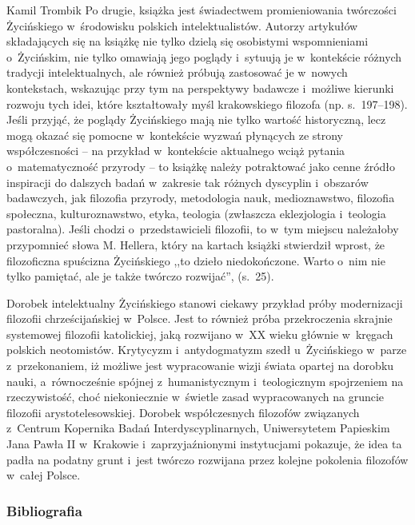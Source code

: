 \begin{recplenv}{Kamil Trombik}
Po drugie, książka jest świadectwem promieniowania twórczości Życińskiego w~środowisku polskich intelektualistów. Autorzy artykułów składających się na książkę nie tylko dzielą się osobistymi wspomnieniami o~Życińskim, nie tylko omawiają jego poglądy i~sytuują je w~kontekście różnych tradycji intelektualnych, ale również próbują zastosować je w~nowych kontekstach, wskazując przy tym na perspektywy badawcze i~możliwe kierunki rozwoju tych idei, które kształtowały myśl krakowskiego filozofa (np. s.~197–198). Jeśli przyjąć, że poglądy Życińskiego mają nie tylko wartość historyczną, lecz mogą okazać się pomocne w~kontekście wyzwań płynących ze strony współczesności -- na przykład w~kontekście aktualnego wciąż pytania o~matematyczność przyrody -- to książkę należy potraktować jako cenne źródło inspiracji do dalszych badań w~zakresie tak różnych dyscyplin i~obszarów badawczych, jak filozofia przyrody, metodologia nauk, medioznawstwo, filozofia społeczna, kulturoznawstwo, etyka, teologia (zwłaszcza eklezjologia i~teologia pastoralna). Jeśli chodzi o~przedstawicieli filozofii, to w~tym miejscu należałoby przypomnieć słowa M. Hellera, który na kartach książki stwierdził wprost, że filozoficzna spuścizna Życińskiego ,,to dzieło niedokończone. Warto o~nim nie tylko pamiętać, ale je także twórczo rozwijać'', (s.~25).

Dorobek intelektualny Życińskiego stanowi ciekawy przykład próby modernizacji filozofii chrześcijańskiej w~Polsce. Jest to również próba przekroczenia skrajnie systemowej filozofii katolickiej, jaką rozwijano w~XX wieku głównie w~kręgach polskich neotomistów. Krytycyzm i~antydogmatyzm szedł u~Życińskiego w~parze z~przekonaniem, iż możliwe jest wypracowanie wizji świata opartej na dorobku nauki, a~równocześnie spójnej z~humanistycznym i~teologicznym spojrzeniem na rzeczywistość, choć niekoniecznie w~świetle zasad wypracowanych na gruncie filozofii arystotelesowskiej. Dorobek współczesnych filozofów związanych z~Centrum Kopernika Badań Interdyscyplinarnych, Uniwersytetem Papieskim Jana Pawła II w~Krakowie i~zaprzyjaźnionymi instytucjami pokazuje, że idea ta padła na podatny grunt i~jest twórczo rozwijana przez kolejne pokolenia filozofów w~całej Polsce.





\subsubsection{Bibliografia}\nopagebreak[4]
\end{recplenv}
